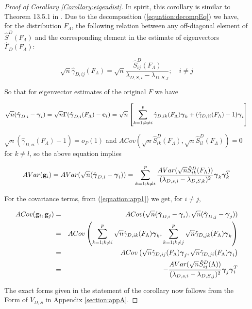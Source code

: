 \begin{proof}[Proof of Corollary \ref{Corollary:eigendist}]
In spirit, this corollary is similar to Theorem 13.5.1 in \cite{anderson}. Due to the decomposition (\ref{equation:decompEq}) we have, for the distribution $F_\Lambda$, the following relation between any off-diagonal element of $\hat S^D(F_\Lambda)$ and the corresponding element in the estimate of eigenvectors $\hat\Gamma_D (F_\Lambda)$:

$$ \sqrt n \hat\gamma_{D,ij} (F_\Lambda) = \sqrt n \frac{\hat S^D_{ij} (F_\Lambda)}{\lambda_{D,S,i} - \lambda_{D,S,j}}; \quad i \neq j$$

So that for eigenvector estimates of the original $F$ we have

\begin{equation} \label{equation:app1}
\sqrt n (\hat{{\boldsymbol{\gamma}}}_{D,i} - {\boldsymbol{\gamma}}_i) = \sqrt n \Gamma (\hat {{\boldsymbol{\gamma}}}_{D,i}(F_\Lambda) - {\bf{e}}_i ) = \sqrt n \left[ \sum_{k=1; k \neq i}^p \hat \gamma_{D,ik}(F_\Lambda){\boldsymbol{\gamma}}_k + (\hat \gamma_{D,ii}(F_\Lambda) - 1){\boldsymbol{\gamma}}_i \right]
\end{equation}

$\sqrt n (\hat \gamma_{D,ii}(F_\Lambda) - 1) =  o_P(1)$ and $ACov(\sqrt n \hat S^D_{ik}(F_\Lambda), \sqrt n \hat S^D_{il}(F_\Lambda)) = 0$ for $k \neq l$, so the above equation implies

$$ AVar({\bf{g}}_i) = AVar (\sqrt n (\hat{{\boldsymbol{\gamma}}}_{D,i} - {\boldsymbol{\gamma}}_i)) = \sum_{k=1; k \neq i}^p \frac{AVar(\sqrt n \hat S^D_{ik}(F_\Lambda))}{(\lambda_{D,s,i} - \lambda_{D,S,k})^2} {\boldsymbol{\gamma}}_k {\boldsymbol{\gamma}}_k^T $$

For the covariance terms, from (\ref{equation:app1}) we get, for $i \neq j$,

\begin{eqnarray*}
ACov({\bf{g}}_i, {\bf{g}}_j) &=& ACov (\sqrt n (\hat{{\boldsymbol{\gamma}}}_{D,i} - {\boldsymbol{\gamma}}_i), \sqrt n (\hat{{\boldsymbol{\gamma}}}_{D,j} - {\boldsymbol{\gamma}}_j))\\
&=& ACov \left( \sum_{k=1; k \neq i}^p \sqrt n \hat \gamma_{D,ik}(F_\Lambda){\boldsymbol{\gamma}}_k, \sum_{k=1; k \neq j}^p \sqrt n \hat \gamma_{D,jk}(F_\Lambda){\boldsymbol{\gamma}}_k \right)\\
&=& ACov \left( \sqrt n \hat \gamma_{D,ij}(F_\Lambda){\boldsymbol{\gamma}}_j, \sqrt n \hat \gamma_{D,ji}(F_\Lambda){\boldsymbol{\gamma}}_i \right)\\
&=& - \frac{AVar(\sqrt n \hat S^D_{ij}(\Lambda))}{(\lambda_{D,s,i} - \lambda_{D,S,j})^2} {\boldsymbol{\gamma}}_j {\boldsymbol{\gamma}}_i^T
\end{eqnarray*}

The exact forms given in the statement of the corollary now follows from the  Form of $V_{D,S}$ in Appendix \ref{section:appA}.


\end{proof}
